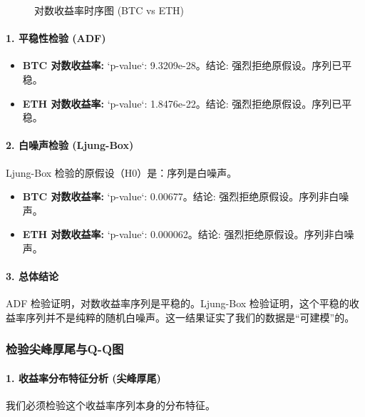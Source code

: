 \documentclass[a4paper]{ctexart}
\begin{document}
	\begin{figure}[htbp]
		\centering
		\caption{对数收益率时序图 (BTC vs ETH)}
		\label{fig:return_timeseries}
	\end{figure}
	
	\paragraph{1. 平稳性检验 (ADF)}
	\begin{itemize}
		\item \textbf{BTC 对数收益率:} `p-value`: 9.3209e-28。结论: 强烈拒绝原假设。序列已平稳。
		\item \textbf{ETH 对数收益率:} `p-value`: 1.8476e-22。结论: 强烈拒绝原假设。序列已平稳。
	\end{itemize}
	
	\paragraph{2. 白噪声检验 (Ljung-Box)}
	Ljung-Box 检验的原假设（H0）是：序列是白噪声。
	\begin{itemize}
		\item \textbf{BTC 对数收益率:} `p-value`: 0.00677。结论: 强烈拒绝原假设。序列非白噪声。
		\item \textbf{ETH 对数收益率:} `p-value`: 0.000062。结论: 强烈拒绝原假设。序列非白噪声。
	\end{itemize}
	
	\paragraph{3. 总体结论}
	ADF 检验证明，对数收益率序列是平稳的。Ljung-Box 检验证明，这个平稳的收益率序列并不是纯粹的随机白噪声。这一结果证实了我们的数据是“可建模”的。
	
	\subsubsection{检验尖峰厚尾与Q-Q图}
	\paragraph{1. 收益率分布特征分析 (尖峰厚尾)}
	我们必须检验这个收益率序列本身的分布特征。
	
\end{document}
